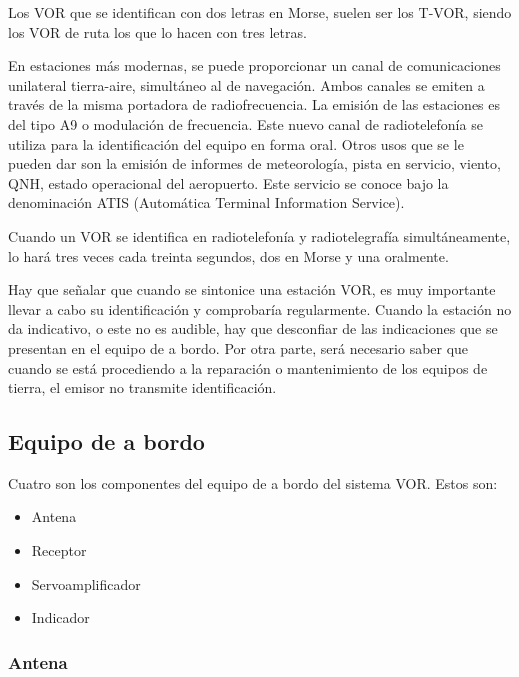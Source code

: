 Los VOR que se identifican con dos letras en Morse, suelen ser los T-VOR, siendo los VOR de ruta los que lo hacen con tres letras.

En estaciones más modernas, se puede proporcionar un canal de comunicaciones unilateral tierra-aire, simultáneo al de navegación. Ambos canales se emiten a través de la misma portadora de radiofrecuencia. La emisión de las estaciones es del tipo A9 o modulación de frecuencia. Este nuevo canal de radiotelefonía se utiliza para la identificación del equipo en forma oral. Otros usos que se le pueden dar son la emisión de informes de meteorología, pista en servicio, viento, QNH, estado operacional del aeropuerto. Este servicio se conoce bajo la denominación ATIS (Automática Terminal Information Service).

Cuando un VOR se identifica en radiotelefonía y radiotelegrafía simultáneamente, lo hará tres veces cada treinta segundos, dos en Morse y una oralmente.

Hay que señalar que cuando se sintonice una estación VOR, es muy importante llevar a cabo su identificación y comprobaría regularmente. Cuando la estación no da indicativo, o este no es audible, hay que desconfiar de las indicaciones que se presentan en el equipo de a bordo. Por otra parte, será necesario saber que cuando se está procediendo a la reparación o mantenimiento de los equipos de tierra, el emisor no transmite identificación.



\subsection{Equipo de a bordo}

Cuatro son los componentes del equipo de a bordo del sistema VOR. Estos son:

\begin{multicols}{2}
  
\begin{itemize}
\item Antena 

\item Receptor


\item Servoamplificador 

\item Indicador

\end{itemize}
\end{multicols}

\subsubsection{Antena }

